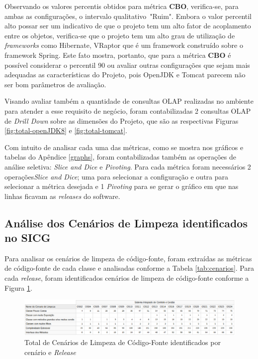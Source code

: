 Observando os valores percentis obtidos para métrica \textbf{CBO}, verifica-se, para ambas as configurações, o intervalo qualitativo~"Ruim". Embora o valor percentil alto possar ser um indicativo de que o projeto tem um alto fator de acoplamento entre os objetos, verifica-se que o projeto tem um alto grau de utilização de \textit{frameworks} como Hibernate, VRaptor que é um framework construído sobre o framework Spring. Este fato mostra, portanto, que para a métrica \textbf{CBO} é possível considerar o percentil 90 ou avaliar outras configurações que sejam mais adequadas as características do Projeto, pois OpenJDK e Tomcat parecem não ser bom parâmetros de avaliação.  


Visando avaliar também a quantidade de consultas OLAP realizadas no ambiente para atender a esse requisito de negócio, foram contabilizadas 2 consultas OLAP de \textit{Drill Down} sobre as dimensões do Projeto, que são as respectivas Figuras \ref{fig:total-openJDK8} e \ref{fig:total-tomcat}. 

Com intuito de analisar cada uma das métricas, como se mostra nos gráficos e tabelas do Apêndice \ref{graphs}, foram contabilizadas também as operações de análise seletiva: \textit{Slice and Dice} e \textit{Pivoting}. Para cada métrica foram necessários 2 operações\textit{Slice and Dice}; uma para selecionar a configuração e outra para selecionar a métrica desejada e 1 \textit{Pivoting} para se gerar o gráfico em que nas linhas ficavam as \textit{releases} do software.  
 

\subsection{Análise dos Cenários de Limpeza identificados no SICG}

Para analisar os cenários de limpeza de código-fonte, foram extraídas as métricas de código-fonte de cada classe e analisadas conforme a Tabela \ref{tab:cenarios}. Para cada \textit{release}, foram identificados cenários de limpeza de código-fonte conforme a Figura \ref{fig:cenarios-release}.


\begin{figure}[ht!]
\centering
\includegraphics[keepaspectratio=true,scale=0.47]{figuras/total-cenario-tipo.eps}
\caption{Total de Cenários de Limpeza de Código-Fonte identificados por cenário e \textit{Release}}
\label{fig:cenarios-release}
\end{figure}
\FloatBarrier


